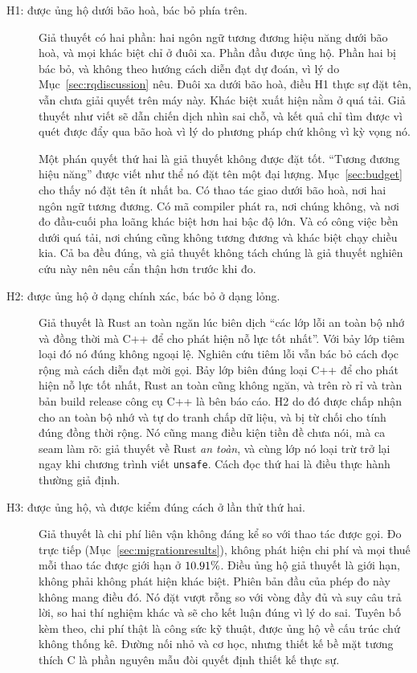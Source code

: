 \begin{description}
  \item[H1: được ủng hộ dưới bão hoà, bác bỏ phía trên.]
        Giả thuyết có hai phần: hai ngôn ngữ tương đương hiệu năng dưới
        bão hoà, và mọi khác biệt chỉ ở đuôi xa. Phần đầu được
        ủng hộ. Phần hai bị bác bỏ, và không theo hướng cách diễn đạt dự đoán,
        vì lý do Mục~\ref{sec:rqdiscussion} nêu. Đuôi xa dưới bão hoà,
        điều H1 thực sự đặt tên, vẫn chưa giải quyết trên máy này. Khác biệt
        xuất hiện nằm ở quá tải. Giả thuyết như viết sẽ dẫn chiến dịch
        nhìn sai chỗ, và kết quả chỉ tìm được vì quét được đẩy
        qua bão hoà vì lý do phương pháp chứ không vì kỳ vọng nó.

        Một phán quyết thứ hai là giả thuyết không được đặt tốt.
        ``Tương đương hiệu năng'' được viết như thể nó đặt tên một đại lượng.
        Mục~\ref{sec:budget} cho thấy nó đặt tên ít nhất ba. Có thao tác
        giao dưới bão hoà, nơi hai ngôn ngữ tương đương. Có mã compiler
        phát ra, nơi chúng không, và nơi đo đầu-cuối pha loãng khác biệt hơn
        hai bậc độ lớn. Và có công việc bền dưới quá tải, nơi chúng
        cũng không tương đương và khác biệt chạy chiều kia. Cả ba đều đúng, và
        giả thuyết không tách chúng là giả thuyết nghiên cứu này nên nêu cẩn thận hơn
        trước khi đo.
  \item[H2: được ủng hộ ở dạng chính xác, bác bỏ ở dạng lỏng.] Giả thuyết là
        Rust an toàn ngăn lúc biên dịch ``các lớp lỗi an toàn bộ nhớ và đồng thời mà C++ để cho phát hiện nỗ lực tốt nhất''. Với bảy lớp tiêm
        loại đó nó đúng không ngoại lệ. Nghiên cứu tiêm lỗi vẫn bác bỏ
        cách đọc rộng mà cách diễn đạt mời gọi. Bảy lớp biên đúng loại
        C++ để cho phát hiện nỗ lực tốt nhất, Rust an toàn cũng không ngăn, và trên
        rò rỉ và tràn bản build release công cụ C++ là bên báo cáo. H2 do đó
        được chấp nhận cho an toàn bộ nhớ và
        tự do tranh chấp dữ liệu, và bị từ chối cho tính đúng đồng thời rộng. Nó cũng mang điều kiện tiền đề chưa nói, mà ca seam làm rõ: giả thuyết về
        Rust \emph{an toàn}, và cùng lớp nó loại trừ trở lại ngay khi chương trình viết
        \texttt{unsafe}. Cách đọc thứ hai
        là điều thực hành thường giả định.
  \item[H3: được ủng hộ, và được kiểm đúng cách ở lần thử thứ hai.] Giả thuyết là
        chi phí liên vận không đáng kể so với thao tác được gọi. Đo
        trực tiếp (Mục~\ref{sec:migrationresults}), không phát hiện chi phí và mọi thuế mỗi thao tác
        được giới hạn ở $10.91\%$. Điều ủng hộ giả thuyết là giới hạn, không phải
        không phát hiện khác biệt. Phiên bản đầu của phép đo này
        không mang điều đó. Nó đặt vượt rỗng so với vòng đầy đủ và suy
        câu trả lời, so hai thí nghiệm khác và sẽ cho
        kết luận đúng vì lý do sai. Tuyên bố kèm theo, chi phí thật
        là công sức kỹ thuật, được ủng hộ về cấu trúc chứ không thống kê. Đường nối
        nhỏ và cơ học, nhưng thiết kế bề mặt tương thích C là phần nguyên mẫu
        đòi quyết định thiết kế thực sự.
\end{description}

